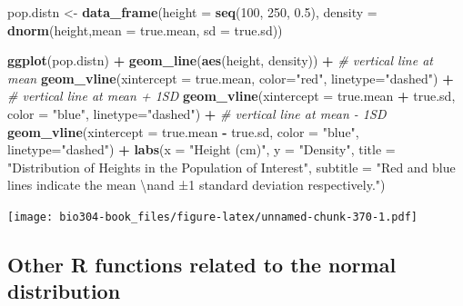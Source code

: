 \documentclass[]{book}
\newenvironment{Shaded}{\begin{snugshade}}{\end{snugshade}}
\newcommand{\CharTok}[1]{\textcolor[rgb]{0.31,0.60,0.02}{#1}}
\newcommand{\CommentTok}[1]{\textcolor[rgb]{0.56,0.35,0.01}{\textit{#1}}}
\newcommand{\DataTypeTok}[1]{\textcolor[rgb]{0.13,0.29,0.53}{#1}}
\newcommand{\DecValTok}[1]{\textcolor[rgb]{0.00,0.00,0.81}{#1}}
\newcommand{\FloatTok}[1]{\textcolor[rgb]{0.00,0.00,0.81}{#1}}
\newcommand{\KeywordTok}[1]{\textcolor[rgb]{0.13,0.29,0.53}{\textbf{#1}}}
\newcommand{\NormalTok}[1]{#1}
\newcommand{\OperatorTok}[1]{\textcolor[rgb]{0.81,0.36,0.00}{\textbf{#1}}}
\newcommand{\StringTok}[1]{\textcolor[rgb]{0.31,0.60,0.02}{#1}}
\theoremstyle{definition}
\theoremstyle{definition}
\theoremstyle{definition}
\theoremstyle{remark}
\begin{document}
\begin{Shaded}
\begin{Highlighting}[]
\NormalTok{pop.distn <-}\StringTok{ }
\StringTok{  }\KeywordTok{data_frame}\NormalTok{(}\DataTypeTok{height =}  \KeywordTok{seq}\NormalTok{(}\DecValTok{100}\NormalTok{, }\DecValTok{250}\NormalTok{, }\FloatTok{0.5}\NormalTok{),}
             \DataTypeTok{density =} \KeywordTok{dnorm}\NormalTok{(height,}\DataTypeTok{mean =}\NormalTok{ true.mean, }\DataTypeTok{sd =}\NormalTok{ true.sd))}

\KeywordTok{ggplot}\NormalTok{(pop.distn) }\OperatorTok{+}
\StringTok{  }\KeywordTok{geom_line}\NormalTok{(}\KeywordTok{aes}\NormalTok{(height, density)) }\OperatorTok{+}\StringTok{ }
\StringTok{  }\CommentTok{# vertical line at mean}
\StringTok{  }\KeywordTok{geom_vline}\NormalTok{(}\DataTypeTok{xintercept =}\NormalTok{ true.mean, }\DataTypeTok{color=}\StringTok{"red"}\NormalTok{, }\DataTypeTok{linetype=}\StringTok{"dashed"}\NormalTok{) }\OperatorTok{+}
\StringTok{  }\CommentTok{# vertical line at mean + 1SD}
\StringTok{  }\KeywordTok{geom_vline}\NormalTok{(}\DataTypeTok{xintercept =}\NormalTok{ true.mean }\OperatorTok{+}\StringTok{ }\NormalTok{true.sd,}
              \DataTypeTok{color =} \StringTok{"blue"}\NormalTok{, }\DataTypeTok{linetype=}\StringTok{"dashed"}\NormalTok{) }\OperatorTok{+}
\StringTok{  }\CommentTok{# vertical line at mean - 1SD}
\StringTok{  }\KeywordTok{geom_vline}\NormalTok{(}\DataTypeTok{xintercept =}\NormalTok{ true.mean }\OperatorTok{-}\StringTok{ }\NormalTok{true.sd,}
              \DataTypeTok{color =} \StringTok{"blue"}\NormalTok{, }\DataTypeTok{linetype=}\StringTok{"dashed"}\NormalTok{) }\OperatorTok{+}
\StringTok{  }\KeywordTok{labs}\NormalTok{(}\DataTypeTok{x =} \StringTok{"Height (cm)"}\NormalTok{, }\DataTypeTok{y =} \StringTok{"Density"}\NormalTok{,}
       \DataTypeTok{title =} \StringTok{"Distribution of Heights in the Population of Interest"}\NormalTok{,}
       \DataTypeTok{subtitle =} \StringTok{"Red and blue lines indicate the mean }\CharTok{\textbackslash{}n}\StringTok{and ±1 standard deviation respectively."}\NormalTok{)  }
\end{Highlighting}
\end{Shaded}

\texttt{[image: bio304-book\_files/figure-latex/unnamed-chunk-370-1.pdf]}

\hypertarget{other-r-functions-related-to-the-normal-distribution}{%
\subsection{Other R functions related to the normal
distribution}\label{other-r-functions-related-to-the-normal-distribution}}
\end{document}
